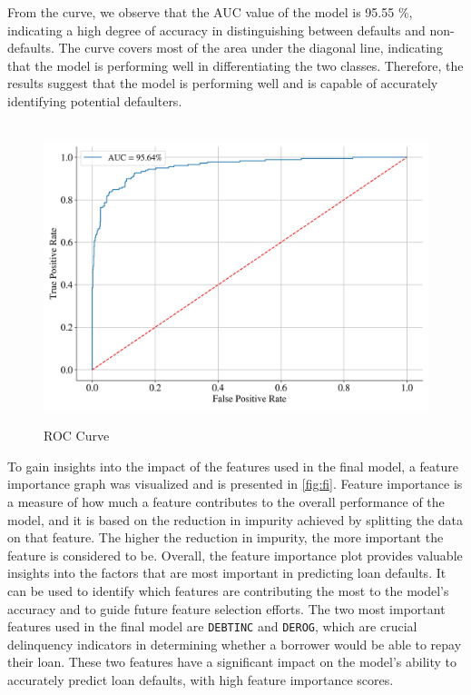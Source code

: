 From the curve, we observe that the AUC value of the model is 95.55 \%, indicating a high degree of accuracy in distinguishing between defaults and non-defaults. The curve covers most of the area under the diagonal line, indicating that the model is performing well in differentiating the two classes. Therefore, the results suggest that the model is performing well and is capable of accurately identifying potential defaulters.

\begin{figure}[H]
\centering
\caption{ROC Curve}\vspace{0.5em}
\label{fig:roc}\
\includegraphics[width=140mm]{Figures/ROC_curve_FINAL.jpg}

\vspace{-1em}
\end{figure}
To gain insights into the impact of the features used in the final model, a feature importance graph was visualized and is presented in \autoref{fig:fi}.
Feature importance is a measure of how much a feature contributes to the overall performance of the model, and it is based on the reduction in impurity achieved by splitting the data on that feature.
The higher the reduction in impurity, the more important the feature is considered to be.
Overall, the feature importance plot provides valuable insights into the factors that are most important in predicting loan defaults. It can be used to identify which features are contributing the most to the model's accuracy and to guide future feature selection efforts.
The two most important features used in the final model are \texttt{DEBTINC} and \texttt{DEROG}, which are crucial delinquency indicators in determining whether a borrower would be able to repay their loan. These two features have a significant impact on the model's ability to accurately predict loan defaults, with high feature importance scores.

